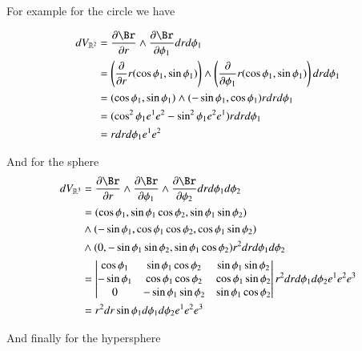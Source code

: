 \documentclass{article}
\begin{document}
For example for the circle we have

\begin{align*}
dV_{\Rm{2}}
&= \PD{r}{\Br} \wedge \PD{\phi_1}{\Br} dr d\phi_1 \\
&= \left(\PD{r}{}r(\cos\phi_1, \sin\phi_1) \right) \wedge \left(\PD{\phi_1}{}r(\cos\phi_1, \sin\phi_1) \right) dr d\phi_1 \\
&= (\cos\phi_1, \sin\phi_1) \wedge (-\sin\phi_1, \cos\phi_1) r dr d\phi_1 \\
&= (\cos^2\phi_1 e^1 e^2 - \sin^2\phi_1 e^2 e^1 ) r dr d\phi_1 \\
&= r dr d\phi_1 e^1 e^2 \\
\end{align*}

And for the sphere
\begin{align*}
dV_{\Rm{3}}
&= \PD{r}{\Br} \wedge \PD{\phi_1}{\Br} \wedge \PD{\phi_2}{\Br} dr d\phi_1 d\phi_2 \\
&= (\cos\phi_1, \sin\phi_1 \cos\phi_2, \sin\phi_1 \sin\phi_2)  \\
&\wedge (-\sin\phi_1, \cos\phi_1 \cos\phi_2, \cos\phi_1 \sin\phi_2)  \\
&\wedge (0, -\sin\phi_1 \sin\phi_2, \sin\phi_1 \cos\phi_2) r^2 dr d\phi_1 d\phi_2 \\
&= 
\begin{vmatrix}
\cos\phi_1 & \sin\phi_1 \cos\phi_2 & \sin\phi_1 \sin\phi_2  \\
-\sin\phi_1 & \cos\phi_1 \cos\phi_2 & \cos\phi_1 \sin\phi_2  \\
0 & -\sin\phi_1 \sin\phi_2 & \sin\phi_1 \cos\phi_2  \\
\end{vmatrix} r^2 dr d\phi_1 d\phi_2 e^1 e^2 e^3 \\
&=
r^2 dr \sin\phi_1 d\phi_1 d\phi_2 e^1 e^2 e^3 \\
\end{align*}

And finally for the hypersphere
\end{document}
